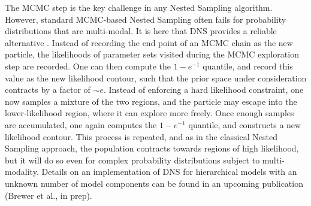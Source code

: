 \documentclass[12pt]{emulateapj}
\begin{document}
The MCMC step is the key challenge in any Nested Sampling algorithm. However, standard MCMC-based Nested Sampling often fails for probability distributions that
are multi-modal. It is here that DNS provides a reliable alternative \citep[for details, see][]{brewer2011}. 
Instead of recording the end point of an MCMC chain as the new particle, the likelihoods of parameter sets visited during the MCMC exploration step
 are recorded. One can then compute the $1-e^{-1}$ quantile, and record this value as the new likelihood contour, such that the prior space
 under consideration contracts by a factor of $\sim\!\! e$. Instead of enforcing a hard likelihood constraint, one now samples a mixture of the 
 two regions, and the particle may escape into the lower-likelihood region, where it can explore more freely. Once enough samples are accumulated,
 one again computes the $1-e^{-1}$ quantile, and constructs a new likelihood contour. This process is repeated, and as in the classical Nested Sampling
 approach, the population contracts towards regions of high likelihood, but it will do so even for complex probability distributions subject to multi-modality.
 Details on an implementation of DNS for hierarchical models with an unknown number of model components can be found in an upcoming publication (Brewer et al., in prep).
 
\end{document}
